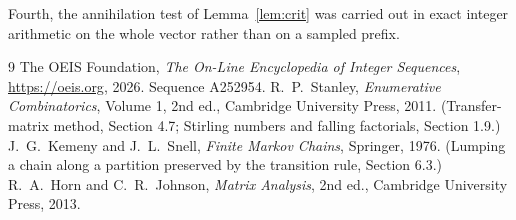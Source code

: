 \documentclass[11pt,a4paper]{article}
\theoremstyle{plain}
\theoremstyle{definition}
\begin{document}
Fourth, the annihilation test of Lemma~\ref{lem:crit} was carried out in exact integer
arithmetic on the whole vector rather than on a sampled prefix.

\begin{thebibliography}{9}
 The OEIS Foundation, \emph{The On-Line Encyclopedia of Integer
Sequences}, \url{https://oeis.org}, 2026. Sequence A252954.
 R.~P.~Stanley, \emph{Enumerative Combinatorics}, Volume 1, 2nd ed.,
Cambridge University Press, 2011. (Transfer-matrix method, Section 4.7; Stirling numbers and
falling factorials, Section 1.9.)
 J.~G.~Kemeny and J.~L.~Snell, \emph{Finite Markov Chains}, Springer,
1976. (Lumping a chain along a partition preserved by the transition rule, Section 6.3.)
 R.~A.~Horn and C.~R.~Johnson, \emph{Matrix Analysis}, 2nd ed., Cambridge
University Press, 2013.
\end{thebibliography}
\end{document}
